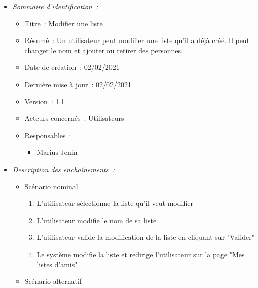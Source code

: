 \begin{itemize}

\item \textit{Sommaire d'identification~:}

    \begin{itemize}
    
    \item Titre~: Modifier une liste
    
    \item Résumé~: Un utilisateur peut modifier une liste qu'il a déjà créé. Il peut changer le nom et ajouter ou retirer des personnes.
    
    \item Date de création~: 02/02/2021
    
    \item Dernière mise à jour~: 02/02/2021
    
    \item Version~: 1.1
    
    \item Acteurs concernés~: Utilisateurs
    
    \item Responsables~: 
    \begin{itemize}
        \item Marius Jenin
    \end{itemize}
    
    \end{itemize}


\item \textit{Description des enchaînements~:}
\begin{itemize}
\item Scénario nominal
\begin{enumerate}
       \item L'utilisateur sélectionne la liste qu'il veut modifier
       \item L'utilisateur modifie le nom de sa liste
       \item L'utilisateur valide la modification de la liste en cliquant sur "Valider"
       \item Le système modifie la liste et redirige l'utilisateur sur la page "Mes listes d'amis"
       
    \end{enumerate}
    \item Scénario alternatif
    

\end{itemize}
\end{itemize}

